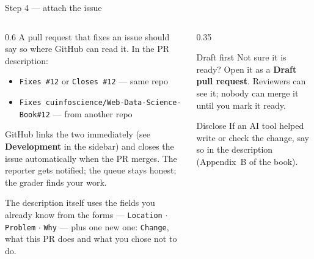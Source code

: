 \documentclass[9pt,aspectratio=169]{beamer}
\begin{document}
\begin{frame}{Step 4 --- attach the issue}
    \begin{columns}[T]
        \begin{column}{0.6\textwidth}
            A pull request that fixes an issue should say so where GitHub can read it. In the PR description:
            \begin{itemize}\small
                \item \texttt{Fixes \#12} or \texttt{Closes \#12} --- same repo
                \item \texttt{Fixes cuinfoscience/Web-Data-Science-Book\#12} --- from another repo
            \end{itemize}
            GitHub links the two immediately (see \textbf{Development} in the sidebar) and closes the issue automatically when the PR merges. The reporter gets notified; the queue stays honest; the grader finds your work.

            \medskip

            The description itself uses the fields you already know from the forms --- \texttt{Location} $\cdot$ \texttt{Problem} $\cdot$ \texttt{Why} --- plus one new one: \texttt{Change}, what this PR does and what you chose not to do.
        \end{column}
        \begin{column}{0.35\textwidth}
            \begin{alertblock}{Draft first}
                \small Not sure it is ready? Open it as a \textbf{Draft pull request}. Reviewers can see it; nobody can merge it until you mark it ready.
            \end{alertblock}
            \begin{alertblock}{Disclose}
                \small If an AI tool helped write or check the change, say so in the description (Appendix~B of the book).
            \end{alertblock}
        \end{column}
    \end{columns}
\end{frame}
\end{document}
